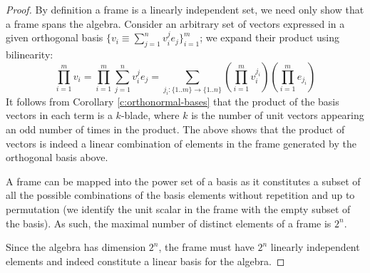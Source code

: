 \begin{proof}
	By definition a frame is a linearly independent set, we need only show that a frame spans the algebra. Consider an arbitrary set of vectors expressed in a given orthogonal basis $\{v_i \equiv \sum_{j=1}^n v_i^je_j\}_{i=1}^m$; we expand their product using bilinearity:
	\[\prod_{i=1}^m v_i = \prod_{i=1}^m \sum_{j=1}^n v_i^j e_j = \sum_{j_i : \{1..m\} \to \{1..n\}} \left(\prod_{i=1}^m v_i^{j_i}\right) \left(\prod_{i=1}^m e_{j_i}\right)\]
	It follows from Corollary \ref{c:orthonormal-bases} that the product of the basis vectors in each term is a $k$-blade, where $k$ is the number of unit vectors appearing an odd number of times in the product. The above shows that the product of vectors is indeed a linear combination of elements in the frame generated by the orthogonal basis above.

	A frame can be mapped into the power set of a basis as it constitutes a subset of all the possible combinations of the basis elements without repetition and up to permutation (we identify the unit scalar in the frame with the empty subset of the basis). As such, the maximal number of distinct elements of a frame is $2^n$.

	Since the algebra has dimension $2^n$, the frame must have $2^n$ linearly independent elements and indeed constitute a linear basis for the algebra.
\end{proof}
